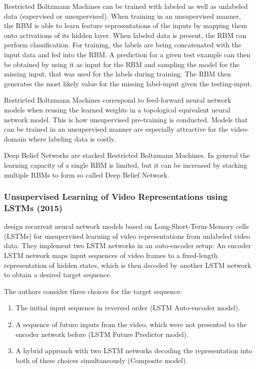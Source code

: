 Restricted Boltzmann Machines can be trained with labeled as well as unlabeled data (supervised or unsupervised).
When training in an unsupervised manner, the RBM is able to learn feature representations of the inputs by mapping them onto activations of its hidden layer.
When labeled data is present, the RBM can perform classification. 
For training, the labels are being concatenated with the input data and fed into the RBM.
A prediction for a given test example can then be obtained by using it as input for the RBM and sampling the model for the missing input, that was used for the labels during training.
The RBM then generates the most likely value for the missing label-input given the testing-input. \cite{fischer_introduction_2012}

Restricted Boltzmann Machines correspond to feed-forward neural network models when reusing the learned weights in a topological equivalent neural network model.
This is how unsupervised pre-training is conducted.
Models that can be trained in an unsupervised manner are especially attractive for the video-domain where labeling data is costly. \cite{fischer_introduction_2012}

Deep Belief Networks are stacked Restricted Boltzmann Machines.
In general the learning capacity of a single RBM is limited, but it can be increased by stacking multiple RBMs to form so called Deep Belief Network. \cite{lee_unsupervised_2011}

\subsubsection{Unsupervised Learning of Video Representations using LSTMs (2015)}
\textcite{srivastava_unsupervised_2015} design recurrent neural network models based on Long-Short-Term-Memory cells (LSTMs) \cite{hochreiter_long_1997} for unsupervised learning of video representations from unlabeled video data.
They implement two LSTM networks in an auto-encoder setup: An encoder LSTM network maps input sequences of video frames to a fixed-length representation of hidden states, which is then decoded by another LSTM network to obtain a desired target sequence.

The authors consider three choices for the target sequence:
\begin{enumerate}
    \item The initial input sequence in reversed order (LSTM Auto-encoder model).
    \item A sequence of future inputs from the video, which were not presented to the encoder network before (LSTM Future Predictor model).
    \item A hybrid approach with two LSTM networks decoding the representation into both of these choices simultaneously (Composite model).
\end{enumerate}

